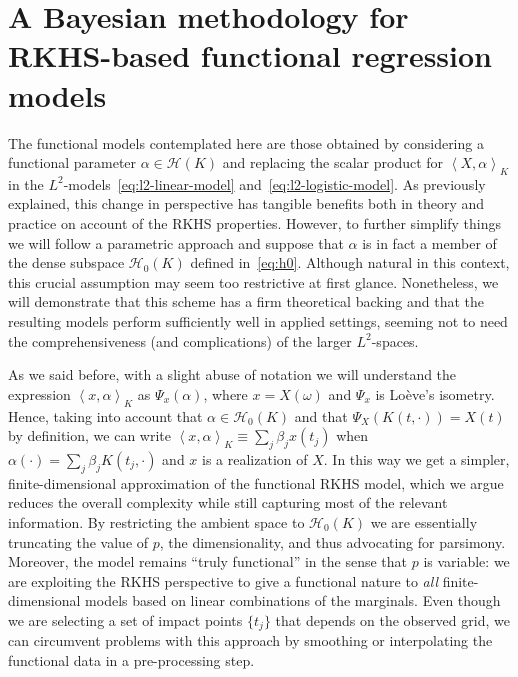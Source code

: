 \documentclass{article}
\numberwithin{equation}{section}
\theoremstyle{plain}
\theoremstyle{definition}
\newcommand{\Hcal}{\mathcal{H}}
\newcommand\dotprod[2]{\left\langle#1,#2\right\rangle}
\begin{document}
\section{A Bayesian methodology for RKHS-based functional regression models}\label{sec:methodology}

The functional models contemplated here are those obtained by considering a functional parameter \(\alpha \in \Hcal(K)\) and replacing the scalar product for \(\dotprod{X}{\alpha}_K\) in the \(L^2\)-models~\eqref{eq:l2-linear-model} and~\eqref{eq:l2-logistic-model}. As previously explained, this change in perspective has tangible benefits both in theory and practice on account of the RKHS properties. However, to further simplify things we will follow a parametric approach and suppose that \(\alpha\) is in fact a member of the dense subspace \(\Hcal_0(K)\) defined in~\eqref{eq:h0}. Although natural in this context, this crucial assumption may seem too restrictive at first glance. Nonetheless, we will demonstrate that this scheme has a firm theoretical backing and that the resulting models perform sufficiently well in applied settings, seeming not to need the comprehensiveness (and complications) of the larger \(L^2\)-spaces. 

As we said before, with a slight abuse of notation we will understand the expression \(\dotprod{x}{\alpha}_K\) as \(\Psi_x(\alpha)\), where \(x=X(\omega)\) and \(\Psi_x\) is Loève's isometry. Hence, taking into account that \(\alpha \in \Hcal_{0}(K)\) and that \(\Psi_X(K(t, \cdot)) = X(t)\) by definition, we can write \(\dotprod{x}{\alpha}_K \equiv \sum_j \beta_j x(t_j)\) when \(\alpha(\cdot)=\sum_j\beta_j K(t_j, \cdot)\) and \(x\) is a realization of \(X\). In this way we get a simpler, finite-dimensional approximation of the functional RKHS model, which we argue reduces the overall complexity while still capturing most of the relevant information. By restricting the ambient space to \(\Hcal_0(K)\) we are essentially truncating the value of \(p\), the dimensionality, and thus advocating for parsimony. Moreover, the model remains ``truly functional'' in the sense that \(p\) is variable: we are exploiting the RKHS perspective to give a functional nature to \textit{all} finite-dimensional models based on linear combinations of the marginals. Even though we are selecting a set of impact points \(\{t_j\}\) that depends on the observed grid, we can circumvent problems with this approach by smoothing or interpolating the functional data in a pre-processing step.
\end{document}
